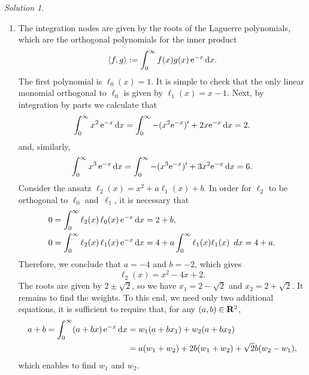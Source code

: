 \documentclass[11pt]{article}
\theoremstyle{definition}
\theoremstyle{remark}
\newtheorem*{solution}{Solution}
\begin{document}
\begin{solution}
\begin{enumerate}
        \item
            The integration nodes are given by the roots of the Laguerre polynomials,
            which are the orthogonal polynomials for the inner product
            \[
                \langle f, g\rangle :=
                \int_{0}^{\infty} f(x) g(x) \, \mathrm e^{-x} \, \mathrm d x.
            \]
            The first polynomial is $\ell_0(x) = 1$.
            It is simple to check that the only linear monomial orthogonal to $\ell_0$ is given by $\ell_1(x) = x - 1$.
            Next, by integration by parts we calculate that
            \[
                \int_{0}^{\infty} x^2 \, \mathrm e^{-x} \, \mathrm d x
                = \int_{0}^{\infty} - (x^2 \mathrm e^{-x})' + 2 x \mathrm e^{-x} \, \mathrm d x = 2.
            \]
            and, similarly,
            \[
                \int_{0}^{\infty} x^3 \, \mathrm e^{-x} \, \mathrm d x
                = \int_{0}^{\infty} - (x^3 \mathrm e^{-x})' + 3 x^2 \mathrm e^{-x} \, \mathrm d x = 6.
            \]
            Consider the ansatz $\ell_2(x) = x^2 + a \ell_1(x) + b$.
            In order for $\ell_2$ to be orthogonal to $\ell_0$ and~$\ell_1$,
            it is necessary that
            \begin{align*}
                0 &= \int_{0}^{\infty} \ell_{2}(x) \, \ell_0(x) \, \mathrm e^{-x} \, \mathrm d x = 2 + b, \\
                0 &= \int_{0}^{\infty} \ell_{2}(x) \, \ell_1(x) \, \mathrm e^{-x} \, \mathrm d x
                = 4 + a \int_{0}^{\infty} \ell_1(x) \ell_1(x) \, \ d x = 4 + a.
            \end{align*}
            Therefore, we conclude that $a = -4$ and $b=-2$,
            which gives
            \[
                \ell_2(x) = x^2 - 4 x + 2.
            \]
            The roots are given by $2 \pm \sqrt{2}$,
            so we have $x_1 = 2 - \sqrt{2}$ and $x_2 = 2 + \sqrt{2}$.
            It remains to find the weights.
            To this end, we need only two additional equations,
            it is sufficient to require that, for any $(a,b) \in \mathbf R^2$,
            \begin{align*}
                a + b =
                \int_{0}^{\infty} (a + bx) \, \mathrm e^{-x} \, \mathrm d x
                &= w_1 (a + b x_1) + w_2 (a + b x_2) \\
                &= a (w_1 + w_2) + 2 b (w_1 + w_2) + \sqrt{2} b (w_2 - w_1),
            \end{align*}
            which enables to find $w_1$ and $w_2$.
    \end{enumerate}
\end{solution}
\end{document}
